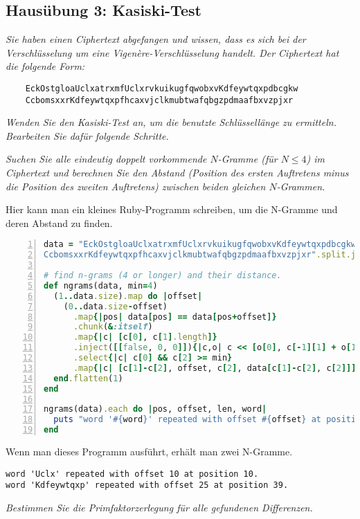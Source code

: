 \documentclass[
  ngerman,
  DIV=12
]{scrartcl}
\begin{document}
\subsection*{Hausübung 3: Kasiski-Test}

\emph{Sie haben einen Ciphertext abgefangen und wissen, dass es sich bei der Verschlüsselung um eine Vigenère-Verschlüsselung handelt. Der Ciphertext hat die folgende Form:}
\begin{verbatim}
    EckOstgloaUclxatrxmfUclxrvkuikugfqwobxvKdfeywtqxpdbcgkw
    CcbomsxxrKdfeywtqxpfhcaxvjclkmubtwafqbgzpdmaafbxvzpjxr
\end{verbatim}
\emph{Wenden Sie den Kasiski-Test an, um die benutzte Schlüssellänge zu ermitteln. Bearbeiten Sie dafür folgende Schritte.}

\medskip\noindent
\emph{Suchen Sie alle eindeutig doppelt vorkommende $N$-Gramme (für $N \leq 4$) im Ciphertext und berechnen Sie den Abstand (Position des ersten Auftretens minus die Position des zweiten Auftretens) zwischen beiden gleichen $N$-Grammen.}

\medskip\noindent
Hier kann man ein kleines Ruby-Programm schreiben, um die N-Gramme und deren Abstand zu finden. 
\begin{lstlisting}[language=ruby,numbers=left,breaklines=true]
data = "EckOstgloaUclxatrxmfUclxrvkuikugfqwobxvKdfeywtqxpdbcgkw
CcbomsxxrKdfeywtqxpfhcaxvjclkmubtwafqbgzpdmaafbxvzpjxr".split.join

# find n-grams (4 or longer) and their distance. 
def ngrams(data, min=4)
  (1..data.size).map do |offset|
    (0..data.size-offset)
      .map{|pos| data[pos] == data[pos+offset]}
      .chunk(&:itself)
      .map{|c| [c[0], c[1].length]}
      .inject([[false, 0, 0]]){|c,o| c << [o[0], c[-1][1] + o[1], o[1]]}
      .select{|c| c[0] && c[2] >= min}
      .map{|c| [c[1]-c[2], offset, c[2], data[c[1]-c[2], c[2]]]}
  end.flatten(1)
end

ngrams(data).each do |pos, offset, len, word|
  puts "word '#{word}' repeated with offset #{offset} at position #{pos}."
end
\end{lstlisting}
Wenn man dieses Programm ausführt, erhält man zwei N-Gramme. 
\begin{lstlisting}
word 'Uclx' repeated with offset 10 at position 10.
word 'Kdfeywtqxp' repeated with offset 25 at position 39.
\end{lstlisting}

\bigskip\noindent
\emph{Bestimmen Sie die Primfaktorzerlegung für alle gefundenen Differenzen.}
\end{document}
